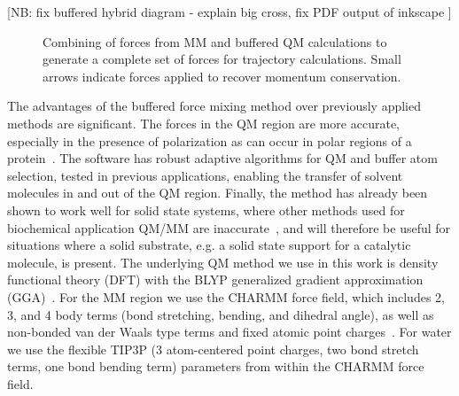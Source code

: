 \documentclass[11pt]{revtex4}
\begin{document}
[NB: fix buffered hybrid diagram - explain big cross, fix PDF output of inkscape ]

\begin{figure}
  \centerline{}
  \caption{Combining of forces from MM and buffered QM calculations
           to generate a complete set of forces for trajectory calculations.
           Small arrows indicate forces applied to recover momentum
           conservation.}
  \label{fig:buffered_hybrid_diagram}
\end{figure}

The advantages of the buffered force mixing method over previously
applied methods are significant.  The forces in the QM region are
more accurate, especially in the presence of polarization as can
occur in polar regions of a protein~\cite{solt_j_phys_chem_b_2009a}.
The software has robust adaptive algorithms for QM and buffer atom
selection, tested in previous applications, enabling the transfer
of solvent molecules in and out of the QM region.  Finally, the
method has already been shown to work well for solid state systems,
where other methods used for biochemical application QM/MM are
inaccurate~\cite{bernstein_rep_prog_phys_2009a}, and will therefore
be useful for situations where a solid substrate, e.g. a solid state
support for a catalytic molecule, is present.  The underlying QM
method we use in this work is density functional theory (DFT) with
the BLYP generalized gradient approximation
(GGA)~\cite{kohn_phys_rev_1965a,becke_phys_rev_a_1988a,lee_phys_rev_b_1988a}.
For the MM region we use the CHARMM force field, which includes 2,
3, and 4 body terms (bond stretching, bending, and dihedral angle),
as well as non-bonded van der Waals type terms and fixed atomic
point charges~\cite{brooks_j_comp_chem_2009a}.  For water we use
the flexible TIP3P (3 atom-centered point charges, two bond stretch terms, one
bond bending term) parameters from within the CHARMM force field.
\end{document}
